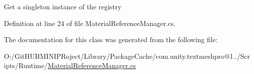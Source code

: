 Get a singleton instance of the registry 



Definition at line 24 of file Material\+Reference\+Manager.\+cs.



The documentation for this class was generated from the following file\+:\begin{DoxyCompactItemize}
\item 
O\+:/\+Git\+H\+U\+B\+M\+I\+N\+I\+P\+Roject/\+Library/\+Package\+Cache/com.\+unity.\+textmeshpro@1../\+Scripts/\+Runtime/\mbox{\hyperlink{_material_reference_manager_8cs}{Material\+Reference\+Manager.\+cs}}\end{DoxyCompactItemize}
